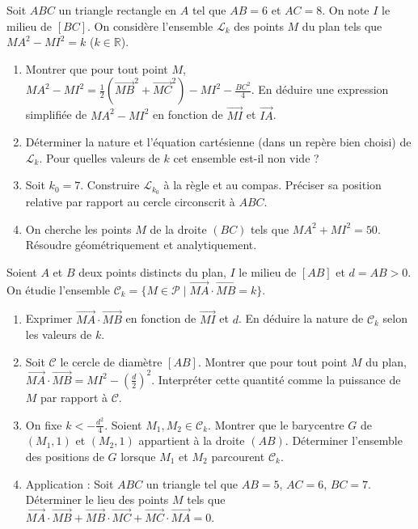 \documentclass[11pt]{article}
\begin{document}
\begin{exercice}[Lignes de niveau $MA^2 \pm MB^2 = k$ et géométrie du triangle]
Soit $ABC$ un triangle rectangle en $A$ tel que $AB = 6$ et $AC = 8$. On note $I$ le milieu de $[BC]$. On considère l'ensemble $\mathcal{L}_k$ des points $M$ du plan tels que $MA^2 - MI^2 = k$ ($k \in \mathbb{R}$).
\begin{enumerate}
    \item Montrer que pour tout point $M$, $MA^2 - MI^2 = \frac{1}{2}(\overrightarrow{MB}^2 + \overrightarrow{MC}^2) - MI^2 - \frac{BC^2}{4}$. En déduire une expression simplifiée de $MA^2 - MI^2$ en fonction de $\overrightarrow{MI}$ et $\overrightarrow{IA}$.
    \item Déterminer la nature et l'équation cartésienne (dans un repère bien choisi) de $\mathcal{L}_k$. Pour quelles valeurs de $k$ cet ensemble est-il non vide ?
    \item Soit $k_0 = 7$. Construire $\mathcal{L}_{k_0}$ à la règle et au compas. Préciser sa position relative par rapport au cercle circonscrit à $ABC$.
    \item On cherche les points $M$ de la droite $(BC)$ tels que $MA^2 + MI^2 = 50$. Résoudre géométriquement et analytiquement.
\end{enumerate}
\end{exercice}

\begin{exercice}[Produit scalaire $\overrightarrow{MA} \cdot \overrightarrow{MB} = k$ et puissance d'un point]
Soient $A$ et $B$ deux points distincts du plan, $I$ le milieu de $[AB]$ et $d = AB > 0$. On étudie l'ensemble $\mathcal{C}_k = \{ M \in \mathcal{P} \mid \overrightarrow{MA} \cdot \overrightarrow{MB} = k \}$.
\begin{enumerate}
    \item Exprimer $\overrightarrow{MA} \cdot \overrightarrow{MB}$ en fonction de $\overrightarrow{MI}$ et $d$. En déduire la nature de $\mathcal{C}_k$ selon les valeurs de $k$.
    \item Soit $\mathcal{C}$ le cercle de diamètre $[AB]$. Montrer que pour tout point $M$ du plan, $\overrightarrow{MA} \cdot \overrightarrow{MB} = MI^2 - \left(\frac{d}{2}\right)^2$. Interpréter cette quantité comme la puissance de $M$ par rapport à $\mathcal{C}$.
    \item On fixe $k < -\frac{d^2}{4}$. Soient $M_1, M_2 \in \mathcal{C}_k$. Montrer que le barycentre $G$ de $(M_1, 1)$ et $(M_2, 1)$ appartient à la droite $(AB)$. Déterminer l'ensemble des positions de $G$ lorsque $M_1$ et $M_2$ parcourent $\mathcal{C}_k$.
    \item Application : Soit $ABC$ un triangle tel que $AB=5$, $AC=6$, $BC=7$. Déterminer le lieu des points $M$ tels que $\overrightarrow{MA} \cdot \overrightarrow{MB} + \overrightarrow{MB} \cdot \overrightarrow{MC} + \overrightarrow{MC} \cdot \overrightarrow{MA} = 0$.
\end{enumerate}
\end{exercice}
\end{document}
